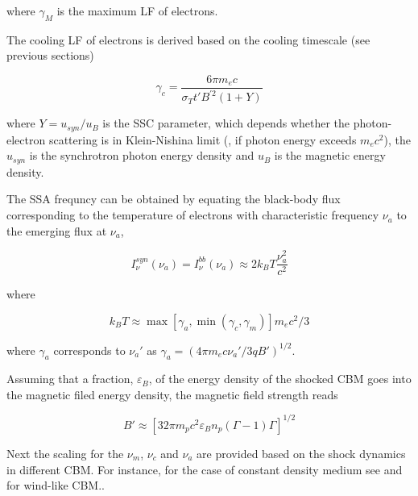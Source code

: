 where $\gamma_M$ is the maximum \ac{LF} of electrons.


The cooling \ac{LF} of electrons is derived based on the cooling timescale (see previous sections)

\begin{equation}
\gamma_c = \frac{6\pi m_e c}{\sigma_T t' B^{'2} (1 + Y)}
\end{equation}

where $Y = u_{syn}/u_{B}$ is the \ac{SSC} parameter, which depends whether the photon-electron scattering is in Klein-Nishina limit (\ie, if photon energy exceeds $m_e c^2$),
the $u_{syn}$ is the synchrotron photon energy density and $u_B$ is the magnetic energy density.

The \ac{SSA} frequncy can be obtained by equating the black-body flux corresponding to the temperature of electrons with characteristic frequency $\nu_a$ to the emerging flux at $\nu_a$, 

\begin{equation}
I_{\nu}^{syn}(\nu_a) = I_{\nu}^{bb}(\nu_a) \approx 2 k_B T \frac{\nu_a^2}{c^2}
\end{equation}

where 

\begin{equation}
k_B T \approx \max[\gamma_a,\min(\gamma_c,\gamma_m)] m_e c ^2 /3
\end{equation}

where $\gamma_a$ corresponds to $\nu_a'$ as $\gamma_a = (4\pi m_e c \nu_a' / 3qB')^{1/2}$.

Assuming that a fraction, $\varepsilon_B$, of the energy density of the shocked \ac{CBM} goes into the magnetic filed energy density, the magnetic field strength reads 

\begin{equation}
B' \approx [32 \pi m_p c^2 \varepsilon_B n_p (\Gamma - 1)\Gamma]^{1/2}
\end{equation}

Next the scaling for the $\nu_m$, $\nu_c$ and $\nu_a$ are provided based on the shock dynamics in different \ac{CBM}. 
For instance, for the case of constant density medium see \citet{Granot:2001ge,Gao:2013mia} and for wind-like \ac{CBM}.. 

